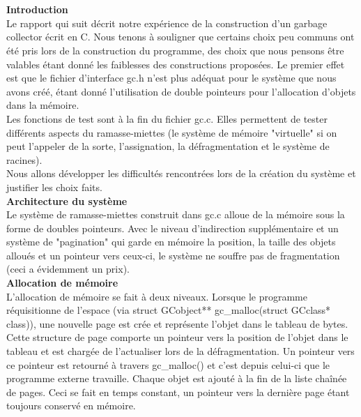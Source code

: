 \documentclass[a4paper, 12pt] {article}
\begin{document}
\begin{center}
\\
\\
\bigskip
\bigskip
\end{center}
\noindent
{\bf Introduction}\\
\noindent
Le rapport qui suit décrit notre expérience de la construction d'un garbage collector écrit en C. Nous
tenons à souligner que certains choix peu communs ont été pris lors de la construction du programme, des choix
que nous pensons être valables étant donné les faiblesses des constructions proposées. Le premier effet est
que le fichier d'interface gc.h n'est plus adéquat pour le système que nous avons créé, étant donné l'utilisation de double
pointeurs pour l'allocation d'objets dans la mémoire.\\ 
\noindent
Les fonctions de test sont à la fin du fichier gc.c. Elles permettent de tester différents aspects 
du ramasse-miettes (le système de mémoire "virtuelle" si on peut l'appeler de la sorte, l'assignation, 
la défragmentation et le système de racines).\\
\noindent
Nous allons développer les difficultés rencontrées lors de la création du système et justifier les choix faits.\\

\noindent
{\bf Architecture du système}\\
\noindent
Le système de ramasse-miettes construit dans gc.c alloue de la mémoire sous la forme de doubles pointeurs. Avec le niveau
d'indirection supplémentaire et un système de "pagination" qui garde en mémoire la position, la taille des objets alloués et un
pointeur vers ceux-ci, le système ne souffre pas de fragmentation (ceci a évidemment un prix).\\

\noindent
{\bf Allocation de mémoire}\\
\noindent
L'allocation de mémoire se fait à deux niveaux. Lorsque le programme réquisitionne de l'espace 
(via struct GCobject** gc\_malloc(struct GCclass* class)), une nouvelle page est crée et représente l'objet dans le tableau de bytes.
Cette structure de page comporte un pointeur vers la position de l'objet dans le tableau et est chargée de l'actualiser lors de
la défragmentation. Un pointeur vers ce pointeur est retourné à travers gc\_malloc() et c'est depuis celui-ci que le programme externe
travaille.
Chaque objet est ajouté à la fin de la liste chaînée de pages. Ceci se fait en temps constant, un pointeur vers la dernière page étant
toujours conservé en mémoire.\\
\end{document}
